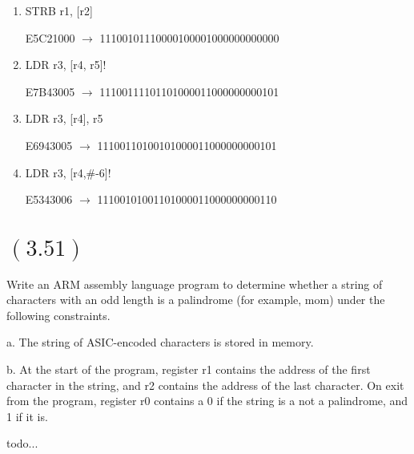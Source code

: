 \documentclass[letterpaper,12pt,titlepage]{article}
\begin{document}
\renewcommand{\labelenumi}{\alph{enumi})}
\begin{enumerate}

\item STRB r1, [r2]

\begin{mdframed}[style=MyFrame]
E5C21000 $\rightarrow$ 11100101110000100001000000000000
\end{mdframed}

\item LDR r3, [r4, r5]!

\begin{mdframed}[style=MyFrame]
E7B43005 $\rightarrow$ 11100111101101000011000000000101
\end{mdframed}

\item LDR r3, [r4], r5

\begin{mdframed}[style=MyFrame]
E6943005 $\rightarrow$ 11100110100101000011000000000101
\end{mdframed}

\item LDR r3, [r4,\#-6]! 

\begin{mdframed}[style=MyFrame]
E5343006 $\rightarrow$ 11100101001101000011000000000110
\end{mdframed}

\end{enumerate}


\section*{$(3.51)$} Write an ARM assembly language program to determine whether a string of characters with an odd length is a palindrome (for example, mom) under the following constraints.

a. The string of ASIC-encoded characters is stored in memory.

b. At the start of the program, register r1 contains the address of the first character in the string, and r2 contains the address of the last character. On exit from the program, register r0 contains a 0 if the string is a not a palindrome, and 1 if it is. \newline

\begin{mdframed}[style=MyFrame]
todo...
\end{mdframed}



\end{document}
